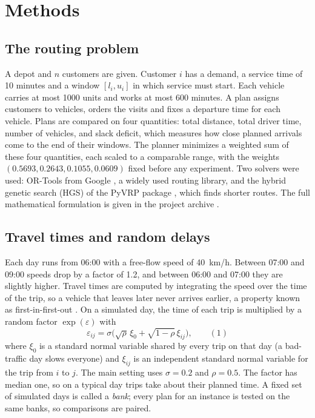 \documentclass[12pt,letterpaper]{article}
\begin{document}
\section{Methods}

\subsection{The routing problem}

A depot and $n$ customers are given. Customer $i$ has a demand, a service time of
10 minutes and a window $[l_i,u_i]$ in which service must start. Each vehicle
carries at most 1000 units and works at most 600 minutes. A plan assigns customers
to vehicles, orders the visits and fixes a departure time for each vehicle. Plans
are compared on four quantities: total distance, total driver time, number of
vehicles, and slack deficit, which measures how close planned arrivals come to the
end of their windows. The planner minimizes a weighted sum of these four
quantities, each scaled to a comparable range, with the weights
$(0.5693,0.2643,0.1055,0.0609)$ fixed before any experiment. Two solvers were used:
OR-Tools from Google \cite{ortools}, a widely used routing library, and the
hybrid genetic search (HGS) of the PyVRP package \cite{vidal2022,wouda2024}, which
finds shorter routes. The full mathematical formulation is given in the project
archive \cite{ali2026archive}.

\subsection{Travel times and random delays}

Each day runs from 06:00 with a free-flow speed of 40~km/h. Between 07:00 and 09:00
speeds drop by a factor of 1.2, and between 06:00 and 07:00 they are slightly higher.
Travel times are computed by integrating the speed over the time of the trip, so a
vehicle that leaves later never arrives earlier, a property known as
first-in-first-out \cite{ichoua2003,ghiani2014}. On a simulated day, the time of each trip is
multiplied by a random factor $\exp(\varepsilon)$ with
\begin{equation}
 \varepsilon_{ij}=\sigma\bigl(\sqrt{\rho}\,\xi_0+\sqrt{1-\rho}\,\xi_{ij}\bigr),
 \qquad(1)
\end{equation}
where $\xi_0$ is a standard normal variable shared by every trip on that day (a
bad-traffic day slows everyone) and $\xi_{ij}$ is an independent standard normal
variable for the trip from $i$ to $j$. The main setting uses $\sigma=0.2$ and
$\rho=0.5$. The factor has median one, so on a typical day trips take about their
planned time. A fixed set of simulated days is called a \emph{bank}; every plan for
an instance is tested on the same banks, so comparisons are paired.
\end{document}
